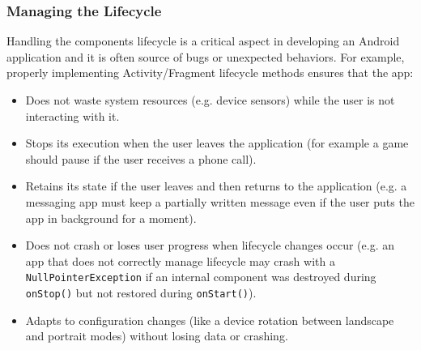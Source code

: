 \documentclass[11pt,a4paper,notitlepage]{article}
\begin{document}
\subsubsection{Managing the Lifecycle}\label{managing_lifecycle}
Handling the components lifecycle is a critical aspect in developing an Android application and it is often source of bugs or unexpected behaviors. For example, properly implementing Activity/Fragment lifecycle methods ensures that the app:
\begin{itemize}
	\item Does not waste system resources (e.g. device sensors) while the user is not interacting with it.
	\item Stops its execution when the user leaves the application (for example a game should pause if the user receives a phone call).
	\item Retains its state if the user leaves and then returns to the application (e.g. a messaging app must keep a partially written message even if the user puts the app in background for a moment).
	\item Does not crash or loses user progress when lifecycle changes occur (e.g. an app that does not correctly manage lifecycle may crash with a \texttt{NullPointerException} if an internal component was destroyed during \texttt{onStop()} but not restored during \texttt{onStart()}).
	\item Adapts to configuration changes (like a device rotation between landscape and portrait modes) without losing data or crashing.
\end{itemize}
\end{document}
